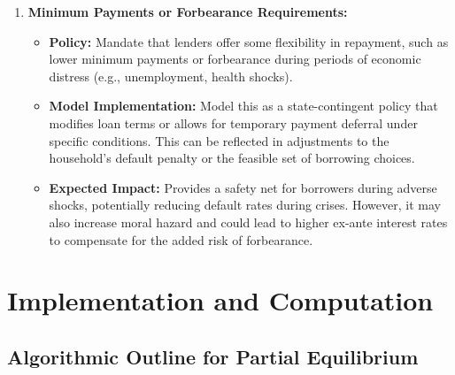 \documentclass[acmsmall]{acmart}
\begin{document}
\begin{enumerate}
    \item \textbf{Minimum Payments or Forbearance Requirements:}
    \begin{itemize}
        \item \textbf{Policy:} Mandate that lenders offer some flexibility in repayment, such as lower minimum payments or forbearance during periods of economic distress (e.g., unemployment, health shocks).
        \item \textbf{Model Implementation:} Model this as a state-contingent policy that modifies loan terms or allows for temporary payment deferral under specific conditions. This can be reflected in adjustments to the household's default penalty or the feasible set of borrowing choices.
        \item \textbf{Expected Impact:} Provides a safety net for borrowers during adverse shocks, potentially reducing default rates during crises. However, it may also increase moral hazard and could lead to higher ex-ante interest rates to compensate for the added risk of forbearance.
    \end{itemize}
\end{enumerate}

\section*{Implementation and Computation}

\subsection*{Algorithmic Outline for Partial Equilibrium}
\end{document}
